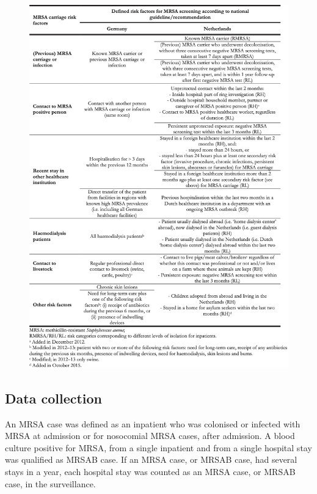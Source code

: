 \documentclass[
]{book}
\begin{document}
\begin{figure}

{\centering \includegraphics[width=1\linewidth]{images/09-t01} 

}

\end{figure}

\hypertarget{data-collection}{%
\subsection{Data collection}\label{data-collection}}

An MRSA case was defined as an inpatient who was colonised or infected with MRSA at admission or for nosocomial MRSA cases, after admission. A blood culture positive for MRSA, from a single inpatient and from a single hospital stay was qualified as MRSAB case. If an MRSA case, or MRSAB case, had several stays in a year, each hospital stay was counted as an MRSA case, or MRSAB case, in the surveillance.
\end{document}
